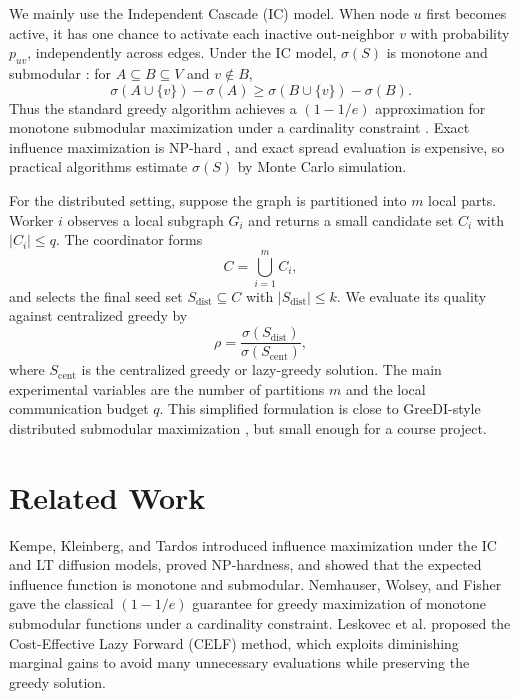 \documentclass[10pt]{article}
\begin{document}
We mainly use the Independent Cascade (IC) model. When node $u$ first becomes active, it has one chance to activate each inactive out-neighbor $v$ with probability $p_{uv}$, independently across edges. Under the IC model, $\sigma(S)$ is monotone and submodular \cite{kempe2003maximizing}: for $A\subseteq B\subseteq V$ and $v\notin B$,
\[
\sigma(A\cup\{v\})-\sigma(A)\ge \sigma(B\cup\{v\})-\sigma(B).
\]
Thus the standard greedy algorithm achieves a $(1-1/e)$ approximation for monotone submodular maximization under a cardinality constraint \cite{nemhauser1978analysis}. Exact influence maximization is NP-hard \cite{kempe2003maximizing}, and exact spread evaluation is expensive, so practical algorithms estimate $\sigma(S)$ by Monte Carlo simulation.

For the distributed setting, suppose the graph is partitioned into $m$ local parts. Worker $i$ observes a local subgraph $G_i$ and returns a small candidate set $C_i$ with $|C_i|\le q$. The coordinator forms
\[
C=\bigcup_{i=1}^{m} C_i,
\]
and selects the final seed set $S_{\mathrm{dist}}\subseteq C$ with $|S_{\mathrm{dist}}|\le k$. We evaluate its quality against centralized greedy by
\[
\rho=\frac{\sigma(S_{\mathrm{dist}})}{\sigma(S_{\mathrm{cent}})},
\]
where $S_{\mathrm{cent}}$ is the centralized greedy or lazy-greedy solution. The main experimental variables are the number of partitions $m$ and the local communication budget $q$. This simplified formulation is close to GreeDI-style distributed submodular maximization \cite{mirzasoleiman2013distributed}, but small enough for a course project.

\section{Related Work}
Kempe, Kleinberg, and Tardos \cite{kempe2003maximizing} introduced influence maximization under the IC and LT diffusion models, proved NP-hardness, and showed that the expected influence function is monotone and submodular. Nemhauser, Wolsey, and Fisher \cite{nemhauser1978analysis} gave the classical $(1-1/e)$ guarantee for greedy maximization of monotone submodular functions under a cardinality constraint. Leskovec et al. \cite{leskovec2007cost} proposed the Cost-Effective Lazy Forward (CELF) method, which exploits diminishing marginal gains to avoid many unnecessary evaluations while preserving the greedy solution.
\end{document}
